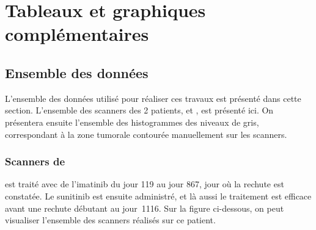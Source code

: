 \documentclass[main.tex]{subfiles}
\begin{document}

\chapter{Tableaux et graphiques complémentaires \label{chap:anx_img_complement}}

\section{Ensemble des données}
L'ensemble des données utilisé pour réaliser ces travaux est présenté dans cette section. L'ensemble des scanners des 2 patients, \Nber et \Chen, est présenté ici. On présentera ensuite l'ensemble des histogrammes des niveaux de gris, correspondant à la zone tumorale contourée manuellement  sur les scanners. 

\newpage
\subsection{Scanners de \Nber}
\Nber est traité avec de l'imatinib du jour 119 au jour 867, jour où la rechute est constatée. Le sunitinib est ensuite administré, et là aussi le traitement est efficace avant une rechute débutant au jour~1116. Sur la figure ci-dessous, on peut visualiser l'ensemble des scanners réalisés sur ce patient.
\end{document}
